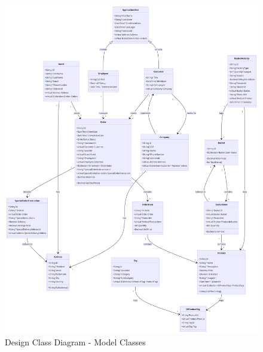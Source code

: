 \begin{figure}
    \centering
    \includegraphics[width=1\textwidth]{figures/diagrams/dcd-modelclasses.png}
    \caption{Design Class Diagram - Model Classes}
    \label{fig:class-diagram-models}
\end{figure}

